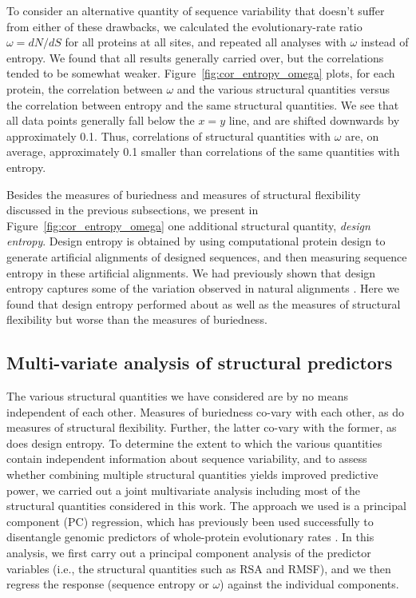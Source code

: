\documentclass[12pt]{article}
\begin{document}
To consider an alternative quantity of sequence variability that doesn't suffer from either of these drawbacks, we calculated the evolutionary-rate ratio $\omega=dN/dS$ for all proteins at all sites, and repeated all analyses with $\omega$ instead of entropy. We found that all results generally carried over, but the correlations tended to be somewhat weaker. Figure~\ref{fig:cor_entropy_omega} plots, for each protein, the correlation between $\omega$ and the various structural quantities versus the correlation between entropy and the same structural quantities. We see that all data points generally fall below the $x=y$ line, and are shifted downwards by approximately 0.1. Thus, correlations of structural quantities with $\omega$ are, on average, approximately 0.1 smaller than correlations of the same quantities with entropy.

Besides the measures of buriedness and measures of structural flexibility discussed in the previous subsections, we present in  Figure~\ref{fig:cor_entropy_omega} one additional structural quantity, \emph{design entropy}. Design entropy is obtained by using computational protein design to generate artificial alignments of designed sequences, and then measuring sequence entropy in these artificial alignments. We had previously shown that design entropy captures some of the variation observed in natural alignments \citep{Jacksonetal2013}. Here we found that design entropy performed about as well as the measures of structural flexibility but worse than the measures of buriedness.

\subsection*{Multi-variate analysis of structural predictors}

The various structural quantities we have considered are by no means independent of each other. Measures of buriedness co-vary with each other, as do measures of structural flexibility. Further, the latter co-vary with the former, as does design entropy. To determine the extent to which the various quantities contain independent information about sequence variability, and to assess whether combining multiple structural quantities yields improved predictive power, we carried out a joint multivariate analysis including most of the structural quantities considered in this work. The approach we used is a principal component (PC) regression, which has previously been used successfully to disentangle genomic predictors of whole-protein evolutionary rates \citep{Drummondetal2006,Bloometal2006}. In this analysis, we first carry out a principal component analysis of the predictor variables (i.e., the structural quantities such as RSA and RMSF), and we then regress the response (sequence entropy or $\omega$) against the individual components.
\end{document}
